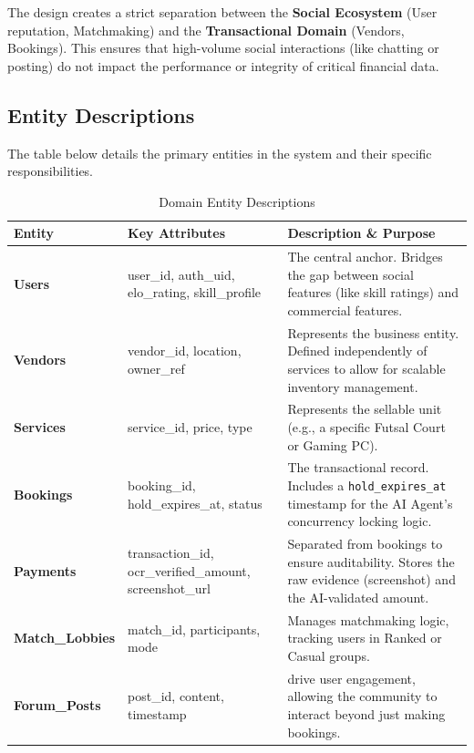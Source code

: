 \documentclass[12pt, a4paper]{article}
\begin{document}
The design creates a strict separation between the \textbf{Social Ecosystem} (User reputation, Matchmaking) and the \textbf{Transactional Domain} (Vendors, Bookings). This ensures that high-volume social interactions (like chatting or posting) do not impact the performance or integrity of critical financial data.

\subsection{Entity Descriptions}
The table below details the primary entities in the system and their specific responsibilities.

\begin{table}[H]
    \centering
    \begin{tabular}{|p{3cm}|p{5cm}|p{6cm}|}
    \hline
    \textbf{Entity} & \textbf{Key Attributes} & \textbf{Description \& Purpose} \\ \hline
    \textbf{Users} & user\_id, auth\_uid, elo\_rating, skill\_profile & The central anchor. Bridges the gap between social features (like skill ratings) and commercial features. \\ \hline
    \textbf{Vendors} & vendor\_id, location, owner\_ref & Represents the business entity. Defined independently of services to allow for scalable inventory management. \\ \hline
    \textbf{Services} & service\_id, price, type & Represents the sellable unit (e.g., a specific Futsal Court or Gaming PC). \\ \hline
    \textbf{Bookings} & booking\_id, hold\_expires\_at, status & The transactional record. Includes a \texttt{hold\_expires\_at} timestamp for the AI Agent's concurrency locking logic. \\ \hline
    \textbf{Payments} & transaction\_id, ocr\_verified\_amount, screenshot\_url & Separated from bookings to ensure auditability. Stores the raw evidence (screenshot) and the AI-validated amount. \\ \hline
    \textbf{Match\_Lobbies} & match\_id, participants, mode & Manages matchmaking logic, tracking users in Ranked or Casual groups. \\ \hline
    \textbf{Forum\_Posts} & post\_id, content, timestamp & drive user engagement, allowing the community to interact beyond just making bookings. \\ \hline
    \end{tabular}
    \caption{Domain Entity Descriptions}
\end{table}
\end{document}
